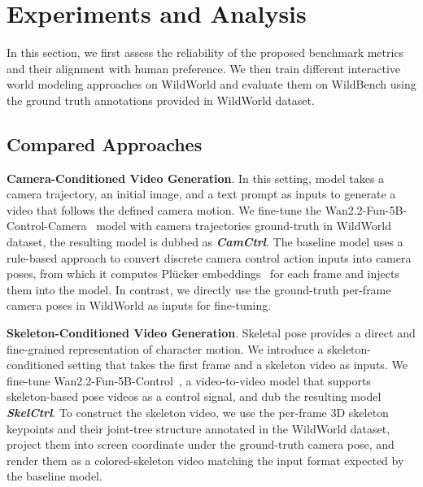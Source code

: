 \section{Experiments and Analysis}

In this section, we first assess the reliability of the proposed benchmark metrics and their alignment with human preference.
We then train different interactive world modeling approaches on WildWorld and evaluate them on WildBench using the ground truth annotations provided in WildWorld dataset.

\subsection{Compared Approaches}

\noindent
\textbf{Camera-Conditioned Video Generation}.
In this setting, model takes a camera trajectory, an initial image, and a text prompt as inputs to generate a video that follows the defined camera motion.
We fine-tune the Wan2.2-Fun-5B-Control-Camera~\cite{wan2025wan} model with camera trajectories ground-truth in WildWorld dataset, the resulting model is dubbed as \textit{\textbf{CamCtrl}}.
The baseline model uses a rule-based approach to convert discrete camera control action inputs into
camera poses, from which it computes Plücker embeddings~\cite{plkemb} for each frame and injects them into
the model.
In contrast, we directly use the ground-truth per-frame camera poses in WildWorld as inputs for fine-tuning.

\noindent
\textbf{Skeleton-Conditioned Video Generation}.
Skeletal pose provides a direct and fine-grained representation of character motion.
We introduce a skeleton-conditioned setting that takes the first frame and a skeleton video as inputs.
We fine-tune Wan2.2-Fun-5B-Control~\cite{wan2025wan}, a video-to-video model that supports skeleton-based pose videos as a control signal, and dub the resulting model \textbf{\textit{SkelCtrl}}.
To construct the skeleton video, we use the per-frame 3D skeleton keypoints and their joint-tree structure annotated in the WildWorld dataset, project them into screen coordinate under the ground-truth camera pose, and render them as a colored-skeleton video matching the input format expected by the baseline model. \par\nopagebreak[4]

